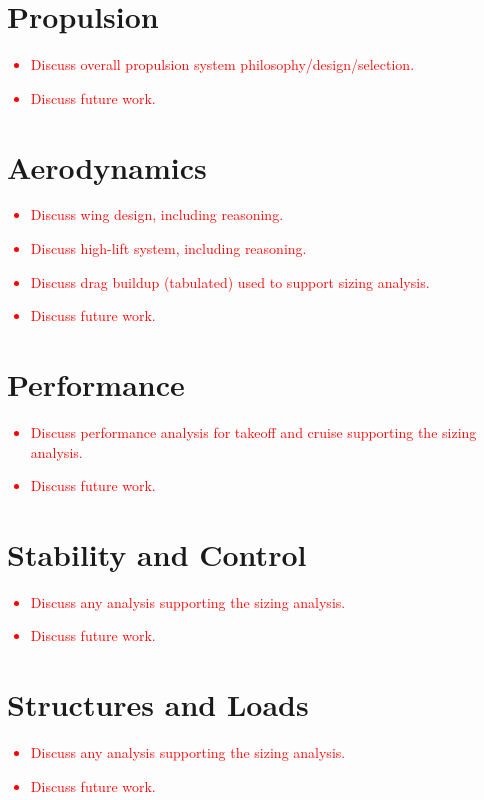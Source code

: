 \documentclass[conf]{new-aiaa}
\begin{document}
\section{Propulsion}
\textcolor{red}{
\begin{itemize}
    \item Discuss overall propulsion system philosophy/design/selection.
    \item Discuss future work.
\end{itemize}}

\section{Aerodynamics}
\textcolor{red}{
\begin{itemize}
    \item Discuss wing design, including reasoning.
    \item Discuss high-lift system, including reasoning.
    \item Discuss drag buildup (tabulated) used to support sizing analysis.
    \item Discuss future work.
\end{itemize}}

\section{Performance}
\textcolor{red}{
\begin{itemize}
    \item Discuss performance analysis for takeoff and cruise supporting the sizing analysis.
    \item Discuss future work.
\end{itemize}}

\section{Stability and Control}
\textcolor{red}{
\begin{itemize}
    \item Discuss any analysis supporting the sizing analysis.
    \item Discuss future work.
\end{itemize}}

\section{Structures and Loads}
\textcolor{red}{
\begin{itemize}
    \item Discuss any analysis supporting the sizing analysis.
    \item Discuss future work.
\end{itemize}}
\end{document}
